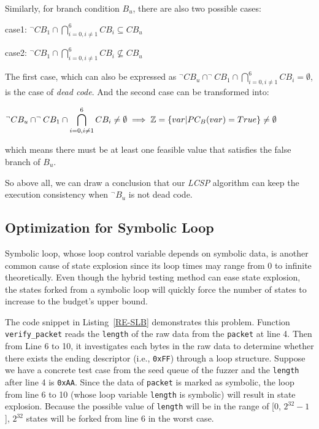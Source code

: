 Similarly, for branch condition $B_u$, there are also two possible cases:
\begin{center}
case1: $\displaystyle ^\neg CB_1 \cap \bigcap\limits_{i=0,i\neq 1}^6 CB_i \subseteq CB_u$

case2: $\displaystyle ^\neg CB_1 \cap \bigcap\limits_{i=0,i\neq 1}^6 CB_i \nsubseteq CB_u$
\end{center}

The first case, which can also be expressed as $^\neg CB_u \cap ^\neg CB_1 \cap \bigcap_{i=0,i\neq 1}^6 CB_i = \emptyset$, is the case of \emph{dead code}. And the second case can be transformed into:
\begin{center}
$\displaystyle ^\neg CB_u \cap ^\neg CB_1 \cap \bigcap\limits_{i=0,i\neq 1}^6 CB_i \neq \emptyset \implies \mathbb{Z} = \{var\arrowvert PC_B(var) = True\} \neq \emptyset$
\end{center}

\noindent which means there must be at least one feasible value that satisfies the false branch of $B_u$.

So above all, we can draw a conclusion that our \emph{LCSP} algorithm can keep the execution consistency when $^\neg B_u$ is not dead code.

\subsection{Optimization for Symbolic Loop}
Symbolic loop, whose loop control variable depends on symbolic data, is another common cause of state explosion since its loop times may range from 0 to infinite theoretically. 
Even though the hybrid testing method can ease state explosion, the states forked from a symbolic loop will quickly force the number of states to increase to the budget's upper bound. 

 

The code snippet in Listing~\ref{RE-SLB} demonstrates this problem. Function \texttt{verify\_packet} reads the \texttt{length} of the raw data from the \texttt{packet} at line 4.
 Then from Line 6 to 10, it investigates each bytes in the raw data to determine whether there exists the ending descriptor (i.e., \texttt{0xFF}) through a loop structure. 
 Suppose we have a concrete test case from the seed queue of the fuzzer and the \texttt{length} after line 4 is \texttt{0xAA}. 
 Since the data of \texttt{packet} is marked as symbolic, the loop from line 6 to 10 (whose loop variable \texttt{length} is symbolic) will result in state explosion.
 Because the possible value of \texttt{length} will be in the range of [0, $2^{32}-1$], $2^{32}$ states will be forked from line 6 in the worst case. 
 
